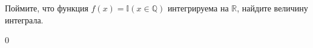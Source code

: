 \begin{task}{1}
Поймите, что функция $f(x) = \mathbb{I}(x \in \mathbb{Q})$ интегрируема на $\mathbb{R}$, найдите величину интеграла.
\end{task}

\begin{solution} 
0
\end{solution}